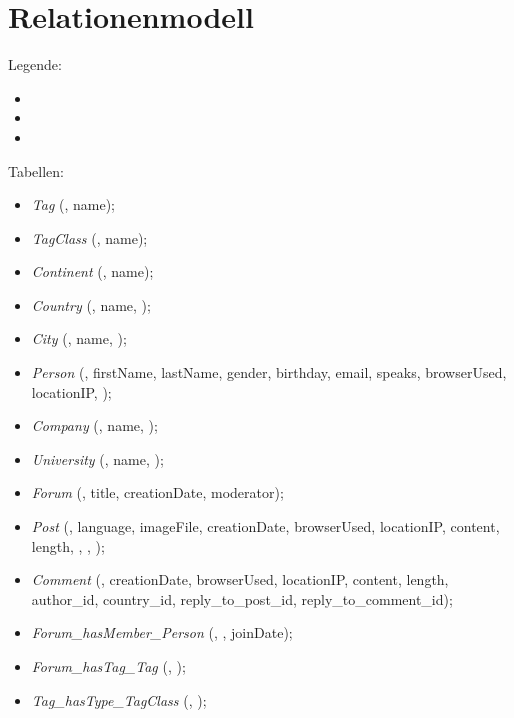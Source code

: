 





\section{Relationenmodell}
Legende:
\begin{itemize}
  \item {}
  \item {}
  \item {}
\end{itemize}

Tabellen:
\begin{itemize}
  \item \emph{Tag} (, name);
  \item \emph{TagClass} (, name);
  \item \emph{Continent} (, name);
  \item \emph{Country} (, name, );
  \item \emph{City} (, name, );
  \item \emph{Person} (, firstName, lastName, gender, birthday, email, speaks, browserUsed, locationIP, );
  \item \emph{Company} (, name, );
  \item \emph{University} (, name, );
  \item \emph{Forum} (, title, creationDate, moderator);
  \item \emph{Post} (, language, imageFile, creationDate, browserUsed, locationIP, content, length, , , );
  \item \emph{Comment} (, creationDate, browserUsed, locationIP, content, length, author\_id, country\_id, reply\_to\_post\_id, reply\_to\_comment\_id);
  \item \emph{Forum\_hasMember\_Person} (, , joinDate);
  \item \emph{Forum\_hasTag\_Tag} (, );
  \item \emph{Tag\_hasType\_TagClass} (, );

\end{itemize}
